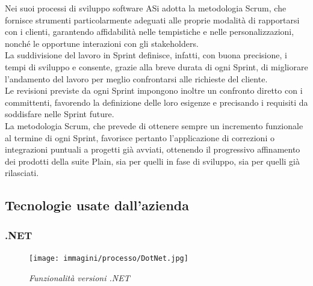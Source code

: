 Nei suoi processi di sviluppo software ASi adotta la metodologia Scrum, che fornisce strumenti particolarmente adeguati alle proprie modalità di rapportarsi con i clienti, garantendo affidabilità nelle tempistiche e nelle personalizzazioni, nonché le opportune interazioni con gli stakeholders.
\\
La suddivisione del lavoro in Sprint definisce, infatti, con buona precisione, i tempi di sviluppo e consente, grazie alla breve durata di ogni Sprint, di migliorare l'andamento del lavoro per meglio confrontarsi alle richieste del cliente.
\\
Le revisioni previste da ogni Sprint impongono inoltre un confronto diretto con i committenti, favorendo la definizione delle loro esigenze e precisando i requisiti da soddisfare nelle Sprint future.
\\
La metodologia Scrum, che prevede di ottenere sempre un incremento funzionale al termine di ogni Sprint, favorisce pertanto l'applicazione di correzioni o integrazioni puntuali a progetti già avviati, ottenendo il progressivo affinamento dei prodotti della suite Plain, sia per quelli in fase di sviluppo, sia per quelli già rilasciati.

\subsection{Tecnologie usate dall'azienda}
\subsubsection{.NET}

\begin{figure}[ht]
	\centering
	\texttt{[image: immagini/processo/DotNet.jpg]}
	\caption{\textit{Funzionalità versioni .NET}}
\end{figure}\FloatBarrier

